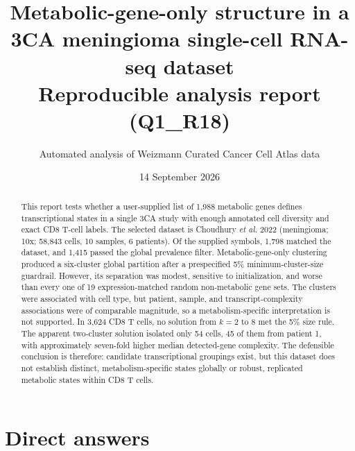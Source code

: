 \documentclass[11pt]{article}
\title{Metabolic-gene-only structure in a 3CA meningioma single-cell RNA-seq dataset\\
\large Reproducible analysis report (Q1\_R18)}
\author{Automated analysis of Weizmann Curated Cancer Cell Atlas data}
\date{14 September 2026}
\begin{document}
\maketitle

\begin{abstract}
This report tests whether a user-supplied list of 1,988 metabolic genes defines transcriptional states in a single 3CA study with enough annotated cell diversity and exact CD8 T-cell labels. The selected dataset is Choudhury \emph{et al.} 2022 (meningioma; 10x; 58,843 cells, 10 samples, 6 patients). Of the supplied symbols, 1,798 matched the dataset, and 1,415 passed the global prevalence filter. Metabolic-gene-only clustering produced a six-cluster global partition after a prespecified 5\% minimum-cluster-size guardrail. However, its separation was modest, sensitive to initialization, and worse than every one of 19 expression-matched random non-metabolic gene sets. The clusters were associated with cell type, but patient, sample, and transcript-complexity associations were of comparable magnitude, so a metabolism-specific interpretation is not supported. In 3,624 CD8 T cells, no solution from $k=2$ to $8$ met the 5\% size rule. The apparent two-cluster solution isolated only 54 cells, 45 of them from patient 1, with approximately seven-fold higher median detected-gene complexity. The defensible conclusion is therefore: candidate transcriptional groupings exist, but this dataset does not establish distinct, metabolism-specific states globally or robust, replicated metabolic states within CD8 T cells.
\end{abstract}

\section{Direct answers}
\end{document}
